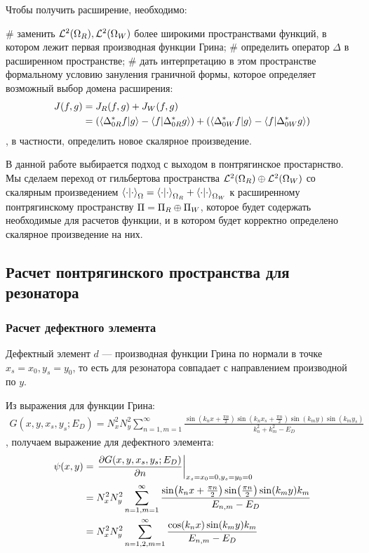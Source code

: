 Чтобы получить расширение, необходимо:
\begin{ilist}
# заменить $\mathcal{L}^2(\Omega_R), \mathcal{L}^2(\Omega_W)$ более широкими пространствами функций, в котором лежит первая производная функции Грина;
# определить оператор $\Delta$ в расширенном пространстве;
# дать интерпретацию в этом пространстве формальному условию зануления граничной формы, которое определяет возможный выбор домена расширения:
\begin{align*}
J(f, g)
& = J_R(f, g) + J_W(f, g) \\
& = (\ip{\Delta_{0R}^* f}{g} - \ip{f}{\Delta_{0R}^* g}) + (\ip{\Delta_{0W}^* f}{g} - \ip{f}{\Delta_{0W}^* g})
\end{align*}
, в частности, определить новое скалярное произведение.
\end{ilist}
В данной работе выбирается подход с выходом в понтрягинское простарнство. Мы сделаем переход от гильбертова пространства $\mathcal{L}^2(\Omega_R) \oplus \mathcal{L}^2(\Omega_W)$ со скалярным произведением $\ipcdot_\Omega = \ipcdot_{\Omega_R} + \ipcdot_{\Omega_W}$ к расширенному понтрягинскому пространству $\Pi = \Pi_R \oplus \Pi_W$, которое будет содержать необходимые для расчетов функции, и в котором будет корректно определено скалярное произведение на них.

\subsection{Расчет понтрягинского пространства для резонатора}
\subsubsection{Расчет дефектного элемента}
Дефектный элемент $d$ — производная функции Грина по нормали в точке $x_s = x_0, y_s = y_0$, то есть для резонатора совпадает с направлением производной по $y$.

Из выражения для функции Грина:
\begin{align*}
G(x, y, x_s, y_s; E_D) = N_x^2 N_y^2 \sum\limits_{n = 1, m = 1}^\infty \frac{\sin(k_n x + \frac{\pi n}{2}) \sin(k_n x_s  + \frac{\pi n}{2}) \sin(k_m y) \sin(k_m y_s)}{k_n^2 + k_m^2 - E_D}
\end{align*}
, получаем выражение для дефектного элемента:
\begin{align*}
\psi(x, y) 
&= \eval{\pdv{G(x, y, x_s, y_s; E_D)}{n}}_{x_s = x_0 = 0, y_s = y_0 = 0} \\
&= N_x^2 N_y^2 \sum\limits_{n = 1, m = 1}^\infty \frac{\sin(k_n x + \frac{\pi n}{2}) \sin(\frac{\pi n}{2}) \sin(k_m y) k_m}{E_{n, m} - E_D} \\
& = N_x^2 N_y^2 \sum\limits_{n = 1,2, m = 1}^\infty \frac{\cos(k_n x) \sin(k_m y) k_m}{E_{n, m} - E_D}
\end{align*}


